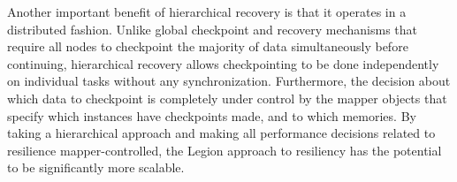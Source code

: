 Another important benefit of hierarchical recovery is
that it operates in a distributed fashion. Unlike global
checkpoint and recovery mechanisms that require all 
nodes to checkpoint the majority of data simultaneously
before continuing, hierarchical recovery allows checkpointing
to be done independently on individual tasks without
any synchronization. Furthermore, the decision about which
data to checkpoint is completely under control by the
mapper objects that specify which instances have checkpoints
made, and to which memories. By taking a hierarchical 
approach and making all performance decisions related to
resilience mapper-controlled, the Legion approach 
to resiliency has the potential to be significantly 
more scalable.

